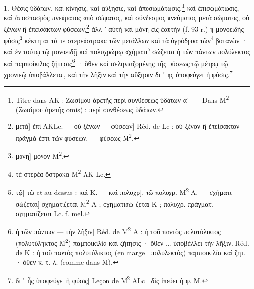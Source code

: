 \documentclass[a4paper, 11pt, oneside, polutonikogreek, french]{article}
\begin{document}
1. Θέσις ὑδάτων, καὶ κίνησις, καὶ αὔξησις, καὶ ἀποσωμάτωσις,\footnote{Titre dans AK : Ζωσίμου ἀρετῆς περὶ συνθέσεως ὑδάτων αʹ. --- Dans M\textsuperscript{2} (Ζωσίμου ἀρετῆς omis) : περὶ συνθέσεως ὑδάτων.} καὶ ἐπισωμάτωσις, καὶ ἀποσπασμὸς πνεύματος ἀπὸ σώματος, καὶ σύνδεσμος πνεύματος μετὰ σώματος, οὐ ξένων ἢ ἐπεισάκτων φύσεων,\footnote{μετὰ] ἐπὶ AKLc. --- ού ξένων --- φύσεων] Réd. de Lc : οὐ ξένον ἢ ἐπείσακτον πρᾶγμά ἐστι τῶν φύσεων. --- φύσεως M\textsuperscript{2}.} ἀλλ ᾽ αὐτὴ καὶ μόνη εὶς ἐαυτὴν (f. 93 r.) ἡ μονοειδὴς φύσις\footnote{μόνη] μόνον M\textsuperscript{2}.} κέκτηται τά τε στερεόστρακα τῶν μετάλλων καὶ τὰ ὑγρόδρυα τῶν\footnote{τὰ στερέα ὄστρακα M\textsuperscript{2} AK Lc.} βοτανῶν · καὶ ἐν τούτῳ τῷ μονοειδῇ καὶ πολυχρώμῳ σχήματι\footnote{τῷ] τῶ et au-dessus : καὶ K. --- καὶ πολυχρ]. τῶ πολυχρ. M\textsuperscript{2} A. --- σχήματι σώζεται] σχηματίζεται M\textsuperscript{2} A ; σχηματισώ ζεται K ; πολυχρ. πράγματι σχηματίζεται Lc. f. mel.} σώζεται ἡ τῶν πάντων πολύλεκτος καὶ παμποίκιλος ζήτησις\footnote{ἡ τῶν πάντων --- τὴν λῆξιν] Réd. de M\textsuperscript{2} A : ἡ τοῦ παντὸς πολυτύλικτος (πολυτύληκτος M\textsuperscript{2}) παμποικιλία καὶ ζήτησις · ὄθεν ... ὑποβάλλει τὴν λῆξιν. Réd. de K : ἡ τοῦ παντός πολυτύλικτος (en marge : πολυλεκτὸς) παμποικιλία καὶ ζητ. · ὄθεν κ. τ. λ. (comme dans M).} · ὅθεν καὶ σεληνιαζομένης τῆς φύσεως τῷ μέτρῳ τῷ χρονικῷ ὑποβάλλεται, καὶ τὴν λῆξιν καὶ τὴν αὔξησιν δι ᾽ ἦς ὑποφεύγει ἡ φύσις.\footnote{δι ᾽ ἧς ὑποφεύγει ἡ φύσις] Leçon de M\textsuperscript{2} ALc ; δὶς ἱπεύει ἡ φ. M.}
\end{document}
